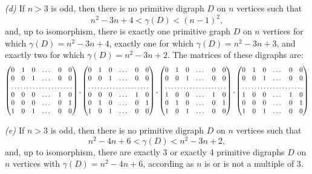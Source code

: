 \documentclass[11pt]{llncs}
\begin{document}
\begin{theorem}
\emph{(d) \cite[Theorem~8]{DM64}} If $n>3$ is odd, then there is no
primitive digraph $D$ on $n$ vertices such that
\begin{equation}
\label{first odd gap}
n^2-3n+4<\gamma(D)<(n-1)^2,
\end{equation}
and, up to isomorphism, there is exactly one primitive graph $D$ on $n$ vertices
for which $\gamma(D)=n^2-3n+4$, exactly one for which $\gamma(D)=n^2-3n+3$, and
exactly two for which $\gamma(D)=n^2-3n+2$. The matrices of these digraphs
are:
\begin{equation}
\label{odd island}
\begin{pmatrix}
0 & 1 & 0 & \dots & 0 & 0\\
0 & 0 & 1 & \dots & 0 & 0\\
\hdotsfor{6}\\
0 & 0 & 0 & \dots & 1 & 0\\
0 & 0 & 0 & \dots & 0 & 1\\
1 & 0 & 1 & \dots & 0 & 0
\end{pmatrix},
\begin{pmatrix}
0 & 1 & 0 & \dots & 0 & 0\\
0 & 0 & 1 & \dots & 0 & 0\\
\hdotsfor{6}\\
0 & 0 & 0 & \dots & 1 & 0\\
0 & 1 & 0 & \dots & 0 & 1\\
1 & 0 & 1 & \dots & 0 & 0
\end{pmatrix},
\begin{pmatrix}
0 & 1 & 0 & \dots & 0 & 0\\
0 & 0 & 1 & \dots & 0 & 0\\
\hdotsfor{6}\\
1 & 0 & 0 & \dots & 1 & 0\\
0 & 1 & 0 & \dots & 0 & 1\\
1 & 0 & 1 & \dots & 0 & 0
\end{pmatrix},
\begin{pmatrix}
0 & 1 & 0 & \dots & 0 & 0\\
0 & 0 & 1 & \dots & 0 & 0\\
\hdotsfor{6}\\
1 & 0 & 0 & \dots & 1 & 0\\
0 & 0 & 0 & \dots & 0 & 1\\
1 & 0 & 1 & \dots & 0 & 0
\end{pmatrix}
\end{equation}

\emph{(e) \cite[Theorem~8]{DM64}} If $n>3$ is odd, then there is no
primitive digraph $D$ on $n$ vertices such that
\begin{equation}
\label{second odd gap}
n^2-4n+6<\gamma(D)<n^2-3n+2,
\end{equation}
and, up to isomorphism, there are exactly 3 or exactly 4 primitive digraphs $D$
on $n$ vertices with $\gamma(D)=n^2-4n+6$, according as $n$ is or is not
a multiple of $3$.
\end{theorem}
\end{document}

